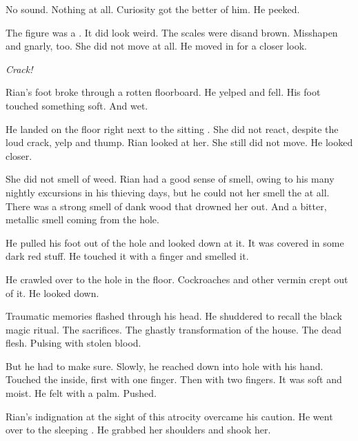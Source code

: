 No sound. 
Nothing at all. 
Curiosity got the better of him. 
He peeked. 

The figure was a \sphyle. 
It did look weird. 
The scales were dis\coloured and brown. 
Misshapen and gnarly, too. 
She did not move at all. 
He moved in for a closer look. 

\emph{Crack!}

Rian's foot broke through a rotten floorboard. 
He yelped and fell. 
His foot touched something soft. 
And wet. 

He landed on the floor right next to the sitting \sphyle. 
She did not react, despite the loud crack, yelp and thump. 
Rian looked at her. 
She still did not move. 
He looked closer. 

She did not smell of weed. 
Rian had a good sense of smell, owing to his many nightly excursions in his thieving days, but he could not her smell the \sphyle{} at all. 
There was a strong smell of dank wood that drowned her out. 
And a bitter, metallic smell coming from the hole. 
  

He pulled his foot out of the hole and looked down at it. 
It was covered in some dark red stuff. 
He touched it with a finger and smelled it. 

He crawled over to the hole in the floor. 
Cockroaches and other vermin crept out of it. 
He looked down. 

Traumatic memories flashed through his head. 
He shuddered to recall the black magic ritual. 
The \human{} sacrifices. 
The ghastly transformation of the house. 
The dead flesh. 
Pulsing with stolen blood. 

But he had to make sure. 
Slowly, he reached down into hole with his hand. 
Touched the inside, first with one finger. 
Then with two fingers. 
It was soft and moist. 
He felt with a palm. 
Pushed. 

Rian's indignation at the sight of this atrocity overcame his caution. 
He went over to the sleeping \sphyle. 
He grabbed her shoulders and shook her.

